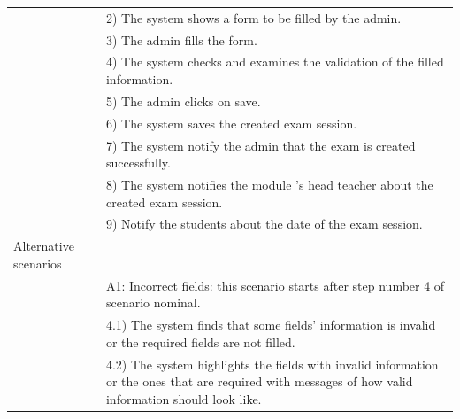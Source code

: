 \documentclass[]{uc2pfecaneva}
\begin{document}
\begin{table}[h]
\begin{tabularx}{\textwidth}{|l|X|}
		& 2) The system shows a form to be filled by the admin.                                                                                                             \\
		& 3) The admin fills the form.                                                                                                                                      \\
		& 4) The system checks and examines the validation of the filled information.                                                                                       \\
		& 5) The admin clicks on save.                                                                                                                                      \\
		& 6) The system saves the created exam session.                                                                                                                     \\
		& 7) The system notify the admin that the exam is created successfully.                                                                                             \\
		& 8) The system notifies the module 's head teacher about the created exam session.                                                                                 \\
		& 9) Notify the students about the date of the exam session.                                                                                                        \\ \hline
		Alternative scenarios &                                                                                                                                                                   \\
		& A1: Incorrect fields: this scenario starts after step number 4 of scenario nominal.                                                                               \\
		& \hspace{4mm}4.1) The system finds that some fields' information is invalid or the required fields are not filled.                                                 \\
		& \hspace{4mm}4.2) The system highlights the fields with invalid information or the ones that are required with messages of how valid information should look like. \\

\end{tabularx}
\end{table}
\end{document}
